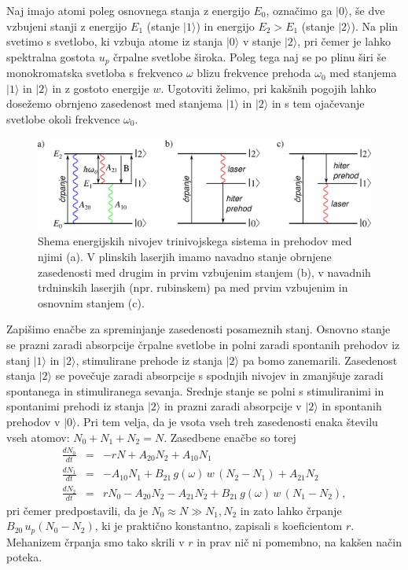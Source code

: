 Naj imajo atomi poleg osnovnega stanja z energijo $E_0$, označimo ga $|0\rangle$,
še dve vzbujeni stanji z energijo $E_1$ (stanje $|1\rangle$) in energijo $E_2>E_1$
(stanje $|2\rangle$). Na plin svetimo s svetlobo, ki
vzbuja atome iz stanja $|0\rangle$ v stanje $|2\rangle$, pri čemer
je lahko spektralna gostota $u_{p}$ črpalne svetlobe široka. Poleg
tega naj se po plinu širi še monokromatska svetloba s frekvenco $\omega$
blizu frekvence prehoda $\omega_{0}$ med stanjema $|1\rangle$ in
$|2\rangle$ in z gostoto energije $w$. Ugotoviti želimo, pri kakšnih
pogojih lahko dosežemo obrnjeno zasedenost med stanjema $|1\rangle$ in $|2\rangle$
in s tem ojačevanje svetlobe okoli frekvence $\omega_{0}$.
\begin{figure}[h]
\centering
\includegraphics[width=14truecm]{slike/05_Trinivojski.png}
\caption{Shema energijskih nivojev trinivojskega sistema in prehodov med njimi (a).
V plinskih laserjih imamo navadno stanje obrnjene zasedenosti med drugim in prvim
vzbujenim stanjem (b), v navadnih trdninskih laserjih (npr. rubinskem) pa med 
prvim vzbujenim in osnovnim stanjem (c).}
\label{fig:3nivojski}
\end{figure}


Zapišimo enačbe za spreminjanje zasedenosti posameznih stanj. Osnovno stanje
se prazni zaradi absorpcije črpalne svetlobe in polni zaradi
spontanih prehodov iz stanj $|1\rangle$ in $|2\rangle$, stimulirane
prehode iz stanja $|2\rangle$ pa bomo zanemarili. Zasedenost stanja $|2\rangle$ se
povečuje zaradi absorpcije s spodnjih nivojev in zmanjšuje
zaradi spontanega in stimuliranega sevanja. Srednje stanje se polni
s stimuliranimi in spontanimi prehodi iz stanja $|2\rangle$ in prazni
zaradi absorpcije v $|2\rangle$ in spontanih prehodov v $|0\rangle$.
Pri tem velja, da je vsota vseh treh zasedenosti enaka številu vseh atomov: $N_{0}+N_{1}+N_{2}=N$. 
Zasedbene enačbe so torej 
\begin{eqnarray}
\frac{dN_{0}}{dt} & = & -rN+A_{20}N_{2}+A_{10}N_{1} \label{4.39.1}\\
\frac{dN_{1}}{dt} & = & -A_{10}N_{1}+B_{21}\,g(\omega)\,w\, (N_{2}-N_{1})+A_{21}N_{2} \label{4.39.2}\\
\frac{dN_{2}}{dt} & = & rN_0-A_{20}N_{2}-A_{21}N_{2}+B_{21}\,g(\omega)\,w\, (N_1-N_2),
\label{4.39}
\end{eqnarray}
pri čemer predpostavili, da je $N_0 \approx N \gg N_1, N_2$ in zato lahko črpanje $B_{20}\, 
u_{p} (N_0-N_2)$, ki je praktično konstantno, zapisali s koeficientom $r$. Mehanizem črpanja 
smo tako skrili v $r$ in prav nič ni pomembno, na kakšen način poteka. 


